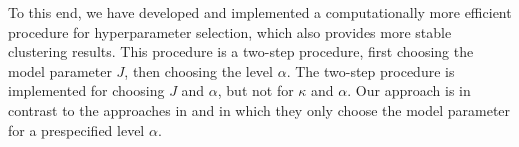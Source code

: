 To this end, we have developed and implemented a computationally more efficient procedure for hyperparameter selection, which also provides  more stable clustering results. This procedure is a two-step procedure, first choosing the model parameter $J$, then choosing the level $\alpha$. The two-step procedure is implemented for choosing $J$ and $\alpha$, but not for $\kappa$ and $\alpha$. %
Our approach is in contrast to the approaches in \citet{Lei:2013} and \citet{Shin:2019} in which they only choose the model parameter for a prespecified level $\alpha$.

